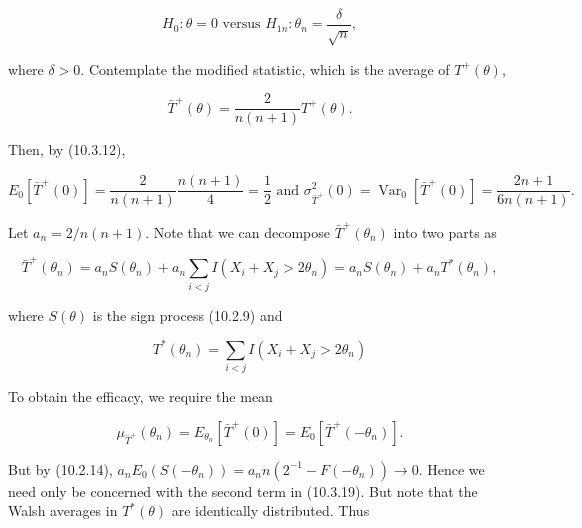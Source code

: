 \begin{equation*}
H_{0}: \theta=0 \text { versus } H_{1 n}: \theta_{n}=\frac{\delta}{\sqrt{n}}, \tag{10.3.16}
\end{equation*}


where $\delta>0$. Contemplate the modified statistic, which is the average of $T^{+}(\theta)$,


\begin{equation*}
\bar{T}^{+}(\theta)=\frac{2}{n(n+1)} T^{+}(\theta) . \tag{10.3.17}
\end{equation*}


Then, by (10.3.12),


\begin{equation*}
E_{0}\left[\bar{T}^{+}(0)\right]=\frac{2}{n(n+1)} \frac{n(n+1)}{4}=\frac{1}{2} \text { and } \sigma_{\bar{T}^{+}}^{2}(0)=\operatorname{Var}_{0}\left[\bar{T}^{+}(0)\right]=\frac{2 n+1}{6 n(n+1)} . \tag{10.3.18}
\end{equation*}


Let $a_{n}=2 / n(n+1)$. Note that we can decompose $\bar{T}^{+}\left(\theta_{n}\right)$ into two parts as


\begin{equation*}
\bar{T}^{+}\left(\theta_{n}\right)=a_{n} S\left(\theta_{n}\right)+a_{n} \sum_{i<j} I\left(X_{i}+X_{j}>2 \theta_{n}\right)=a_{n} S\left(\theta_{n}\right)+a_{n} T^{*}\left(\theta_{n}\right), \tag{10.3.19}
\end{equation*}


where $S(\theta)$ is the sign process (10.2.9) and


\begin{equation*}
T^{*}\left(\theta_{n}\right)=\sum_{i<j} I\left(X_{i}+X_{j}>2 \theta_{n}\right) \tag{10.3.20}
\end{equation*}


To obtain the efficacy, we require the mean


\begin{equation*}
\mu_{\bar{T}^{+}}\left(\theta_{n}\right)=E_{\theta_{n}}\left[\bar{T}^{+}(0)\right]=E_{0}\left[\bar{T}^{+}\left(-\theta_{n}\right)\right] . \tag{10.3.21}
\end{equation*}


But by (10.2.14), $a_{n} E_{0}\left(S\left(-\theta_{n}\right)\right)=a_{n} n\left(2^{-1}-F\left(-\theta_{n}\right)\right) \rightarrow 0$. Hence we need only be concerned with the second term in (10.3.19). But note that the Walsh averages in $T^{*}(\theta)$ are identically distributed. Thus


